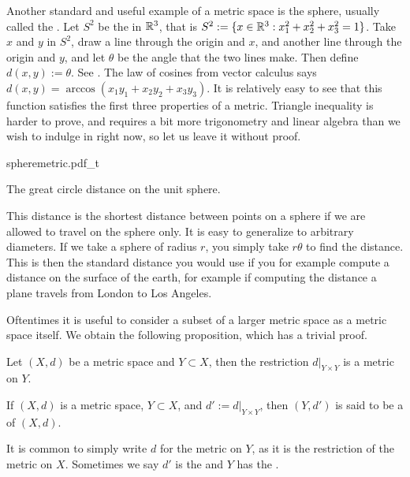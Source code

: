 \begin{example}
Another standard and useful example of a metric space is the sphere,
usually called the \emph{}.
Let $S^2$ be the  in ${\mathbb{R}}^3$,
that is $S^2 := \{ x \in {\mathbb{R}}^3 : x_1^2+x_2^2+x_3^2 = 1 \}$.
Take $x$ and $y$ in $S^2$, draw a line through the origin and $x$,
and another line through the origin and $y$,
and let $\theta$ be the angle that the two lines make.
Then define $d(x,y) := \theta$.  See .
The law of cosines from vector calculus says
$d(x,y) = \arccos(x_1y_1+x_2y_2+x_3y_3)$.
It is relatively easy to see that this function satisfies the first three
properties of a metric.
Triangle inequality is harder to prove, and requires a bit more
trigonometry and linear algebra than we wish to indulge in right now, so let
us leave it without proof.

\begin{myfigureht}
{spheremetric.pdf_t}
\caption{The great circle distance on the unit
sphere.\label{fig:spheremetric}}
\end{myfigureht}

This distance is the shortest distance between points on a sphere if
we are allowed to travel on the sphere only.  It is easy to
generalize to arbitrary diameters.  If we take a sphere of radius
$r$, you simply take $r \theta$ to find the distance.  This is then the
standard distance you would use if you for example compute a distance on the
surface of the earth, for example if computing the distance a plane travels from London to
Los Angeles.
\end{example}

Oftentimes it is useful to consider a subset of a larger metric space
as a metric space itself.  We obtain the following proposition, which has
a trivial proof.

\begin{prop}
Let $(X,d)$ be a metric space and $Y \subset X$, then the restriction
$d|_{Y \times Y}$ is a metric on $Y$.
\end{prop}

\begin{defn}
If $(X,d)$ is a metric space, $Y \subset X$, and $d' := d|_{Y \times Y}$,
then $(Y,d')$ is said to be a \emph{} of $(X,d)$.
\end{defn}

It is common to simply write $d$ for the metric on $Y$, as it is 
the restriction of the metric on $X$.  Sometimes we say $d'$ is
the \emph{} and $Y$ has the
\emph{}.

